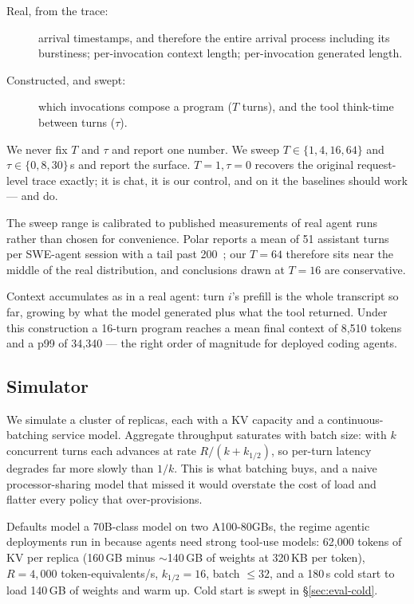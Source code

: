\documentclass[sigconf,nonacm]{acmart}
\begin{document}
\begin{description}
\item[Real, from the trace:] arrival timestamps, and therefore the entire
  arrival process including its burstiness; per-invocation context length;
  per-invocation generated length.
\item[Constructed, and swept:] which invocations compose a program ($T$
  turns), and the tool think-time between turns ($\tau$).
\end{description}

We never fix $T$ and $\tau$ and report one number. We sweep
$T\in\{1,4,16,64\}$ and $\tau\in\{0,8,30\}$\,s and report the surface.
$T{=}1,\tau{=}0$ recovers the original request-level trace exactly; it is
chat, it is our control, and on it the baselines should work --- and do.

The sweep range is calibrated to published measurements of real agent runs
rather than chosen for convenience. Polar reports a mean of 51 assistant
turns per SWE-agent session with a tail past 200~\cite{polar}; our
$T{=}64$ therefore sits near the middle of the real distribution, and
conclusions drawn at $T{=}16$ are conservative.

Context accumulates as in a real agent: turn $i$'s prefill is the whole
transcript so far, growing by what the model generated plus what the tool
returned. Under this construction a 16-turn program reaches a mean final
context of 8{,}510 tokens and a p99 of 34{,}340 --- the right order of
magnitude for deployed coding agents.

\subsection{Simulator}

We simulate a cluster of replicas, each with a KV capacity and a
continuous-batching service model. Aggregate throughput saturates with
batch size: with $k$ concurrent turns each advances at rate
$R/(k+k_{1/2})$, so per-turn latency degrades far more slowly than
$1/k$. This is what batching buys, and a naive processor-sharing model
that missed it would overstate the cost of load and flatter every policy
that over-provisions.

Defaults model a 70B-class model on two A100-80GBs, the regime agentic
deployments run in because agents need strong tool-use models: 62{,}000
tokens of KV per replica (160\,GB minus $\sim$140\,GB of weights at
320\,KB per token), $R = 4{,}000$ token-equivalents/s, $k_{1/2}=16$,
batch $\le 32$, and a 180\,s cold start to load 140\,GB of weights and
warm up. Cold start is swept in \S\ref{sec:eval-cold}.
\end{document}
